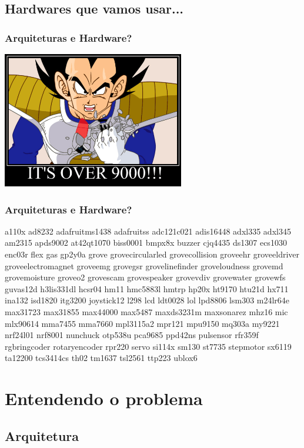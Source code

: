 \documentclass{beamer}
\begin{document}
\subsection{Hardwares que vamos usar...}
\begin{frame} \frametitle{Arquiteturas e Hardware?}
    \includegraphics[width=300px]{images/over--9000}
\end{frame}

\begin{frame} \frametitle{Arquiteturas e Hardware?}

a110x ad8232 adafruitms1438 adafruitss adc121c021 adis16448 adxl335 adxl345
am2315 apds9002 at42qt1070 biss0001 bmpx8x buzzer cjq4435 ds1307 ecs1030
enc03r flex gas gp2y0a grove grovecircularled grovecollision groveehr groveeldriver
groveelectromagnet groveemg grovegsr grovelinefinder groveloudness grovemd
grovemoisture groveo2 grovescam grovespeaker grovevdiv grovewater grovewfs
guvas12d h3lis331dl hcsr04 hm11 hmc5883l hmtrp hp20x ht9170 htu21d hx711 ina132
isd1820 itg3200 joystick12 l298 lcd ldt0028 lol lpd8806 lsm303 m24lr64e max31723
max31855 max44000 max5487 maxds3231m maxsonarez mhz16 mic mlx90614 mma7455 mma7660
mpl3115a2 mpr121 mpu9150 mq303a my9221 nrf24l01 nrf8001 nunchuck otp538u
pca9685 ppd42ns pulsensor rfr359f rgbringcoder rotaryencoder rpr220 servo si114x
sm130 st7735 stepmotor sx6119 ta12200 tcs3414cs th02 tm1637 tsl2561 ttp223 ublox6

\end{frame}

\section{ Entendendo o problema }

\subsection{ Arquitetura}
\end{document}
